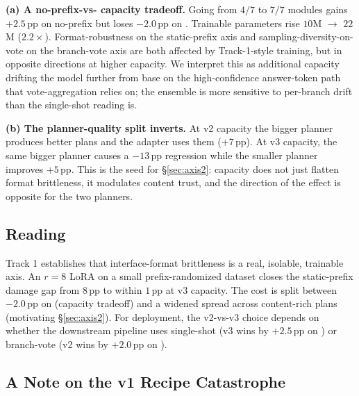 \textbf{(a) A no-prefix-vs-\cmaj{} capacity tradeoff.}  Going from
$4/7$ to $7/7$ modules gains $+2.5$\,pp on no-prefix \ctwo{} but
loses $-2.0$\,pp on \cmaj{}.  Trainable parameters rise $10$M $\to$
$22$M ($2.2\times$).  Format-robustness on the static-prefix axis
and sampling-diversity-on-vote on the branch-vote axis are both
affected by Track-1-style training, but in opposite directions at
higher capacity.  We interpret this as additional capacity drifting
the model further from base on the high-confidence answer-token
path that vote-aggregation relies on; the \cmaj{} ensemble is more
sensitive to per-branch drift than the single-shot reading is.

\textbf{(b) The planner-quality split inverts.}  At v2 capacity
the bigger  planner produces better plans and the
adapter uses them ($+7$\,pp).  At v3 capacity, the same bigger
planner causes a $-13$\,pp regression while the smaller
 planner improves $+5$\,pp.  This is the seed for
\S\ref{sec:axis2}: capacity does not just flatten format
brittleness, it modulates content trust, and the direction of the
effect is opposite for the two planners.

\subsection{Reading}
\label{subsec:axis1_reading}

Track 1 establishes that interface-format brittleness is a real,
isolable, trainable axis.  An $r{=}8$ LoRA on a small
prefix-randomized dataset closes the static-prefix damage gap from
$8$\,pp to within $1$\,pp at v3 capacity.  The cost is split
between $-2.0$\,pp on \cmaj{} (capacity tradeoff) and a widened
spread across content-rich plans (motivating \S\ref{sec:axis2}).
For deployment, the v2-vs-v3 choice depends on whether the
downstream pipeline uses single-shot (v3 wins by $+2.5$\,pp on
\ctwo{}) or branch-vote (v2 wins by $+2.0$\,pp on \cmaj{}).

\subsection{A Note on the v1 Recipe Catastrophe}
\label{subsec:axis1_v1_catastrophe}


